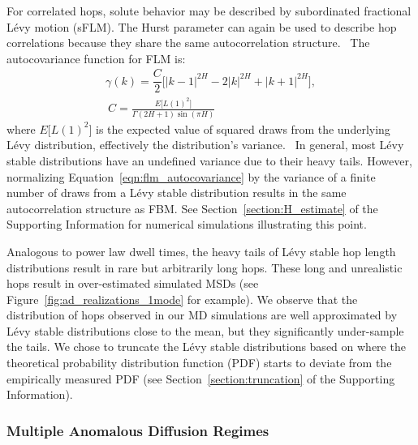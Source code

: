 \documentclass[journal=ancac3,manuscript=article,layout=twocolumn]{achemso}
\begin{document}
  For correlated hops, solute behavior may be described by subordinated
  fractional L\'evy motion (sFLM). The Hurst parameter can again be used to
  describe hop correlations because they share the same autocorrelation
  structure.~\cite{tikanmaki_fractional_2010} The autocovariance function for
  FLM is:
  \begin{equation}
  \begin{gathered}
    \gamma(k) = \dfrac{C}{2}\bigg[|k-1|^{2H} - 2|k|^{2H} + |k+1|^{2H}\bigg], \\
    ~C = \frac{E\big[L(1)^2\big]}{\Gamma(2H + 1)\sin(\pi H)}
  \end{gathered}
  \label{eqn:flm_autocovariance}
  \end{equation}
  where $E\big[L(1)^2\big]$ is the expected value of squared draws from the 
  underlying L\'evy distribution, effectively the distribution's 
  variance.~\cite{bishwal_maximum_2011} In general, most L\'evy stable distributions
  have an undefined variance due to their heavy tails. However, normalizing
  Equation~\ref{eqn:flm_autocovariance} by the variance of a finite number of draws
  from a L\'evy stable distribution results in the same autocorrelation structure as FBM.
  See Section~\ref{section:H_estimate} of the Supporting Information for numerical
  simulations illustrating this point.
  
  Analogous to power law dwell times, the heavy tails of L\'evy stable hop
  length distributions result in rare but arbitrarily long hops. These long and
  unrealistic hops result in over-estimated simulated MSDs (see
  Figure~\ref{fig:ad_realizations_1mode} for example). We observe that the
  distribution of hops observed in our MD simulations are well approximated by
  L\'evy stable distributions close to the mean, but they significantly
  under-sample the tails. We chose to truncate the L\'evy stable distributions
  based on where the theoretical probability distribution function (PDF) starts
  to deviate from the empirically measured PDF (see
  Section~\ref{section:truncation} of the Supporting Information).~\cite{mantegna_stochastic_1994}

  \subsubsection*{Multiple Anomalous Diffusion Regimes}
  
\end{document}
